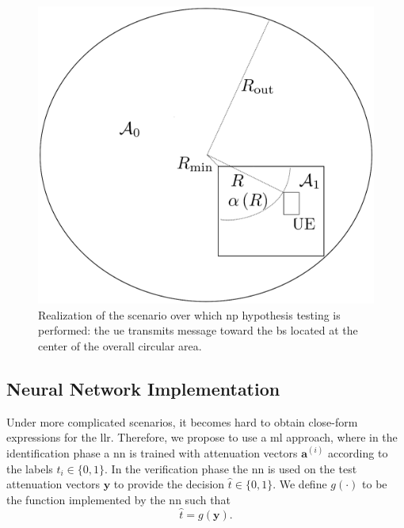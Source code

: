 \documentclass[conference,draftcls,onecolumn]{IEEEtran}
\begin{document}
\begin{figure} 
    \centering
    \includegraphics[width=0.5\columnwidth]{simpleScen.eps}
    \caption{Realization of the scenario over which \ac{np} hypothesis testing is performed: the \ac{ue} transmits message toward the \ac{bs} located at the center of the overall circular area. }
    \label{fig:scen}
\end{figure}

\subsection{Neural Network Implementation}\label{sec:nn}

Under more complicated scenarios, it becomes hard to obtain close-form expressions for the \ac{llr}. Therefore, we propose to use a \ac{ml} approach, where in the identification phase a \ac{nn} is trained with attenuation vectors $\bm{a}^{(i)}$ according to the labels $t_i \in \{0,1\}$. In the verification phase the \ac{nn} is used on the test attenuation vectors $\bm{y}$ to provide the decision $\hat{t} \in \{0,1\}$. We define $g(\cdot)$ to be the function implemented by the \ac{nn} such that
 \begin{equation}
 	\hat{t} = g(\bm{y}).	
 \end{equation}
\end{document}
